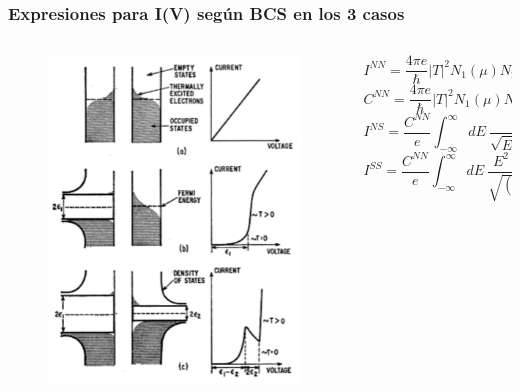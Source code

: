 \begin{frame}
\frametitle{Expresiones para I(V) seg\'un BCS en los 3 casos}

\begin{columns}
\begin{column}{0.4\textwidth}
	\begin{figure}[!h] \label{fermi_levels}
	\includegraphics[width=\textwidth]{fermi_levels}
	\end{figure}
\end{column}
\begin{column}{0.6\textwidth}
\begin{flushleft}
	\begin{equation*}\label{inn}
		I^{NN} = \frac{4\pi e}{\hbar} |T|^2 N_1(\mu)N_2(\mu) eV
	\end{equation*}
	\begin{equation*}\label{cnn}
		C^{NN} = \frac{4\pi e}{\hbar} |T|^2 N_1(\mu)N_2(\mu) e
	\end{equation*}
\vspace{0.7cm}
	\begin{equation*}\label{ins}
		I^{NS} = \frac{C^{NN}}{e} \int_{-\infty}^{\infty} dE\ \frac{|E|}{\sqrt{E^2-\Delta^2}} [f(E-eV)-f(E)]
	\end{equation*}
\vspace{0.7cm}	
	\begin{equation*}\label{iss}
		I^{SS} = \frac{C^{NN}}{e} \int_{-\infty}^{\infty} dE\ 
		\frac{E^2\ [f(E-eV)-f(E)]}{\sqrt{(E^2-\Delta_1 ^2)}\sqrt{(E^2-\Delta_2 ^2)}}
	\end{equation*}
\end{flushleft}
\end{column}
\end{columns}


\end{frame}
